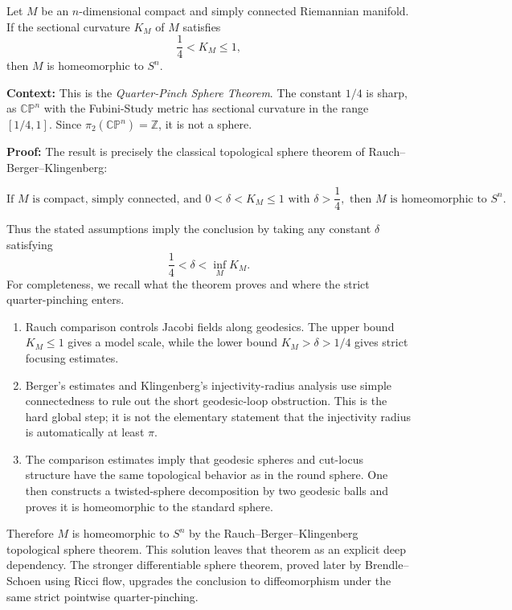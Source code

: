 \begin{exercise}
\label{geometry:2018:12}
Let $M$ be an $n$-dimensional compact and simply connected Riemannian manifold. If the sectional curvature $K_{M}$ of $M$ satisfies
\[
\frac{1}{4} < K_{M} \leq 1,
\]
then $M$ is homeomorphic to $S^{n}$.
\end{exercise}

\begin{solution}
\textbf{Context:} 
This is the \textit{Quarter-Pinch Sphere Theorem}. The constant $1/4$ is sharp, as $\mathbb{CP}^n$ with the Fubini-Study metric has sectional curvature in the range $[1/4, 1]$. Since $\pi_2(\mathbb{CP}^n) = \mathbb{Z}$, it is not a sphere.

\textbf{Proof:}
The result is precisely the classical topological sphere theorem of Rauch--Berger--Klingenberg:

\[
\text{If }M\text{ is compact, simply connected, and }0<\delta<K_M\leq 1
\text{ with }\delta>\frac14,\text{ then }M\text{ is homeomorphic to }S^n.
\]

Thus the stated assumptions imply the conclusion by taking any constant $\delta$ satisfying
\[
\frac14<\delta<\inf_M K_M.
\]
For completeness, we recall what the theorem proves and where the strict quarter-pinching enters.

\begin{enumerate}
    \item Rauch comparison controls Jacobi fields along geodesics. The upper bound $K_M\leq 1$ gives a model scale, while the lower bound $K_M>\delta>1/4$ gives strict focusing estimates.

    \item Berger's estimates and Klingenberg's injectivity-radius analysis use simple connectedness to rule out the short geodesic-loop obstruction. This is the hard global step; it is not the elementary statement that the injectivity radius is automatically at least $\pi$.

    \item The comparison estimates imply that geodesic spheres and cut-locus structure have the same topological behavior as in the round sphere. One then constructs a twisted-sphere decomposition by two geodesic balls and proves it is homeomorphic to the standard sphere.
\end{enumerate}

Therefore $M$ is homeomorphic to $S^n$ by the Rauch--Berger--Klingenberg topological sphere theorem. This solution leaves that theorem as an explicit deep dependency. The stronger differentiable sphere theorem, proved later by Brendle--Schoen using Ricci flow, upgrades the conclusion to diffeomorphism under the same strict pointwise quarter-pinching.
\end{solution}
